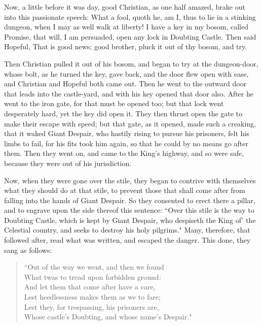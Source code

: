 Now, a little before it was day, good Christian, as one half amazed, brake out into this passionate speech: What a fool, quoth he, am I, thus to lie in a stinking dungeon, when I may as well walk at liberty! I have a key in my bosom, called Promise, that will, I am persuaded, open any lock in Doubting Castle. Then said Hopeful, That is good news; good brother, pluck it out of thy bosom, and try.

Then Christian pulled it out of his bosom, and began to try at the dungeon-door, whose bolt, as he turned the key, gave back, and the door flew open with ease, and Christian and Hopeful both came out. Then he went to the outward door that leads into the castle-yard, and with his key opened that door also. After he went to the iron gate, for that must be opened too; but that lock went desperately hard, yet the key did open it. They then thrust open the gate to make their escape with speed; but that gate, as it opened, made such a creaking, that it waked Giant Despair, who hastily rising to pursue his prisoners, felt his limbs to fail, for his fits took him again, so that he could by no means go after them. Then they went on, and came to the King's highway, and so were safe, because they were out of his jurisdiction.

Now, when they were gone over the stile, they began to contrive with themselves what they should do at that stile, to prevent those that shall come after from falling into the hands of Giant Despair. So they consented to erect there a pillar, and to engrave upon the side thereof this sentence: ``Over this stile is the way to Doubting Castle, which is kept by Giant Despair, who despiseth the King of' the Celestial country, and seeks to destroy his holy pilgrims." Many, therefore, that followed after, read what was written, and escaped the danger. This done, they sang as follows:

\begin{verse} 
``Out of the way we went, and then we found\\
What twas to tread upon forbidden ground:\\
And let them that come after have a care,\\
Lest heedlessness makes them as we to fare;\\
Lest they, for trespassing, his prisoners are,\\
Whose castle's Doubting, and whose name's Despair."\\ 
\end{verse} 
